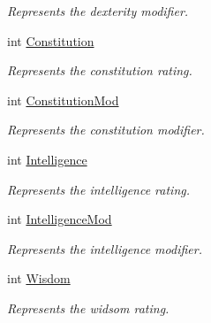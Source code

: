 \begin{DoxyCompactItemize}
\begin{DoxyCompactList}\small\item\em Represents the dexterity modifier. \end{DoxyCompactList}\item 
int \mbox{\hyperlink{class_dungeons__n___dragons___manager_1_1_models_1_1_monster_af976456f488c7b3b9fe7d7e6bb5908e3}{Constitution}}
\begin{DoxyCompactList}\small\item\em Represents the constitution rating. \end{DoxyCompactList}\item 
int \mbox{\hyperlink{class_dungeons__n___dragons___manager_1_1_models_1_1_monster_a61b454c5b9120f217fd35341b5127d76}{Constitution\+Mod}}
\begin{DoxyCompactList}\small\item\em Represents the constitution modifier. \end{DoxyCompactList}\item 
int \mbox{\hyperlink{class_dungeons__n___dragons___manager_1_1_models_1_1_monster_ac9541952783e1f8c55b498c6546a65cc}{Intelligence}}
\begin{DoxyCompactList}\small\item\em Represents the intelligence rating. \end{DoxyCompactList}\item 
int \mbox{\hyperlink{class_dungeons__n___dragons___manager_1_1_models_1_1_monster_aada656e025bbc3a9c8476da6de37c618}{Intelligence\+Mod}}
\begin{DoxyCompactList}\small\item\em Represents the intelligence modifier. \end{DoxyCompactList}\item 
int \mbox{\hyperlink{class_dungeons__n___dragons___manager_1_1_models_1_1_monster_acd44420e506ee56f5b76dfdc7f37d2d4}{Wisdom}}
\begin{DoxyCompactList}\small\item\em Represents the widsom rating. \end{DoxyCompactList}\item 

\end{DoxyCompactItemize}

